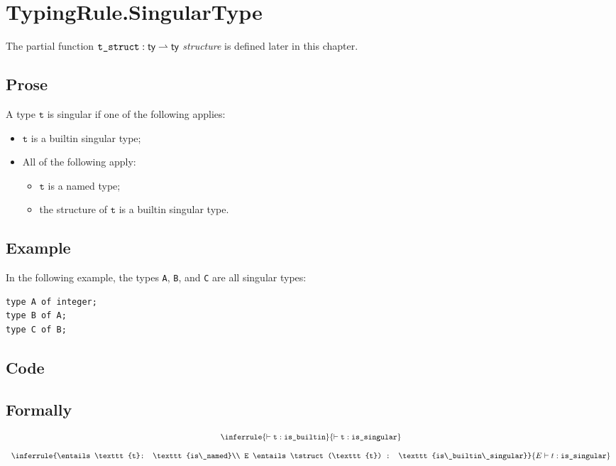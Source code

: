 \documentclass{book}
\newcommand\isbuiltinsingular[0]{\texttt{is\_builtin\_singular}}
\newcommand\isbuiltin[0]{\texttt{is\_builtin}}
\newcommand\isnamed[0]{\texttt{is\_named}}
\newcommand\issingular[0]{\texttt{is\_singular}}
\newcommand\vt[0]{\texttt{t}}
\begin{document}
\section{TypingRule.SingularType}

The partial function $\texttt{t\_struct} : \textsf{ty} \rightharpoonup \textsf{ty}$ \emph{structure} is defined later in this chapter.

    \subsection{Prose}
    A type $\vt$ is singular if one of the following applies:
    \begin{itemize}
    \item $\vt$ is a builtin singular type;
    \item All of the following apply:
      \begin{itemize}
      \item $\vt$ is a named type;
      \item the structure of $\vt$ is a builtin singular type.
      \end{itemize} 
    \end{itemize}

    \subsection{Example}
In the following example, the types \texttt{A}, \texttt{B}, and \texttt{C} are all singular types:
\begin{verbatim}
type A of integer;
type B of A;
type C of B;
\end{verbatim}

    \subsection{Code}

\begin{formal}
      \subsection{Formally}
\[
\begin{array}{c}
\inferrule{\entails \vt : \isbuiltin}{\entails \vt : \issingular}\\
\\
\inferrule{\entails \vt : \isnamed \\ E \entails \tstruct(\vt) : \isbuiltinsingular}{
E \entails t : \issingular}
\end{array}
\]      

\end{formal}
\end{document}
